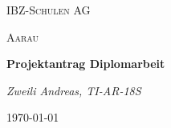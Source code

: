 \begin{titlepage}
    \centering
    {\scshape\LARGE IBZ-Schulen AG\par}
    {\scshape\Large Aarau\par}
    \vspace{1.5cm}
    {\huge\bfseries Projektantrag Diplomarbeit\par}
    \vspace{2cm}
    {\Large\itshape Zweili Andreas, TI-AR-18S\par}
    \vfill

    {\large \today\par}
\thispagestyle{empty}
\end{titlepage}
